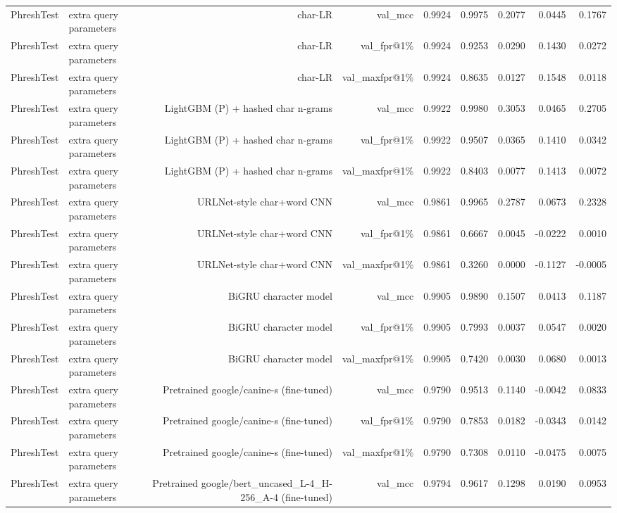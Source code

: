 \begin{table}[t]
\begin{tabular}{llrrrrrrr}
PhreshTest & extra query parameters & char-LR & val\_mcc & 0.9924 & 0.9975 & 0.2077 & 0.0445 & 0.1767 \\
PhreshTest & extra query parameters & char-LR & val\_fpr@1\% & 0.9924 & 0.9253 & 0.0290 & 0.1430 & 0.0272 \\
PhreshTest & extra query parameters & char-LR & val\_maxfpr@1\% & 0.9924 & 0.8635 & 0.0127 & 0.1548 & 0.0118 \\
PhreshTest & extra query parameters & LightGBM (P) + hashed char n-grams & val\_mcc & 0.9922 & 0.9980 & 0.3053 & 0.0465 & 0.2705 \\
PhreshTest & extra query parameters & LightGBM (P) + hashed char n-grams & val\_fpr@1\% & 0.9922 & 0.9507 & 0.0365 & 0.1410 & 0.0342 \\
PhreshTest & extra query parameters & LightGBM (P) + hashed char n-grams & val\_maxfpr@1\% & 0.9922 & 0.8403 & 0.0077 & 0.1413 & 0.0072 \\
PhreshTest & extra query parameters & URLNet-style char+word CNN & val\_mcc & 0.9861 & 0.9965 & 0.2787 & 0.0673 & 0.2328 \\
PhreshTest & extra query parameters & URLNet-style char+word CNN & val\_fpr@1\% & 0.9861 & 0.6667 & 0.0045 & -0.0222 & 0.0010 \\
PhreshTest & extra query parameters & URLNet-style char+word CNN & val\_maxfpr@1\% & 0.9861 & 0.3260 & 0.0000 & -0.1127 & -0.0005 \\
PhreshTest & extra query parameters & BiGRU character model & val\_mcc & 0.9905 & 0.9890 & 0.1507 & 0.0413 & 0.1187 \\
PhreshTest & extra query parameters & BiGRU character model & val\_fpr@1\% & 0.9905 & 0.7993 & 0.0037 & 0.0547 & 0.0020 \\
PhreshTest & extra query parameters & BiGRU character model & val\_maxfpr@1\% & 0.9905 & 0.7420 & 0.0030 & 0.0680 & 0.0013 \\
PhreshTest & extra query parameters & Pretrained google/canine-s (fine-tuned) & val\_mcc & 0.9790 & 0.9513 & 0.1140 & -0.0042 & 0.0833 \\
PhreshTest & extra query parameters & Pretrained google/canine-s (fine-tuned) & val\_fpr@1\% & 0.9790 & 0.7853 & 0.0182 & -0.0343 & 0.0142 \\
PhreshTest & extra query parameters & Pretrained google/canine-s (fine-tuned) & val\_maxfpr@1\% & 0.9790 & 0.7308 & 0.0110 & -0.0475 & 0.0075 \\
PhreshTest & extra query parameters & Pretrained google/bert\_uncased\_L-4\_H-256\_A-4 (fine-tuned) & val\_mcc & 0.9794 & 0.9617 & 0.1298 & 0.0190 & 0.0953 \\

\end{tabular}
\end{table}
